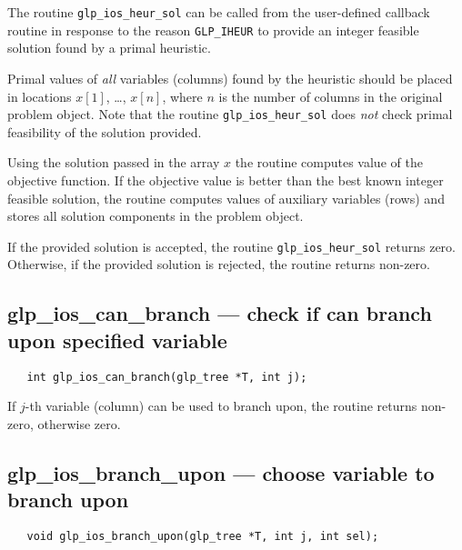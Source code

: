 The routine \verb|glp_ios_heur_sol| can be called from the user-defined
callback routine in response to the reason \verb|GLP_IHEUR| to provide
an integer feasible solution found by a primal heuristic.

Primal values of {\it all} variables (columns) found by the heuristic
should be placed in locations $x[1]$, \dots, $x[n]$, where $n$ is the
number of columns in the original problem object. Note that the routine
\verb|glp_ios_heur_sol| does {\it not} check primal feasibility of the
solution provided.

Using the solution passed in the array $x$ the routine computes value
of the objective function. If the objective value is better than the
best known integer feasible solution, the routine computes values of
auxiliary variables (rows) and stores all solution components in the
problem object.

\returns

If the provided solution is accepted, the routine
\verb|glp_ios_heur_sol| returns zero. Otherwise, if the provided
solution is rejected, the routine returns non-zero.

\vspace*{-5pt}

\subsection{glp\_ios\_can\_branch --- check if can branch upon
specified variable}

\synopsis

\begin{verbatim}
   int glp_ios_can_branch(glp_tree *T, int j);
\end{verbatim}

\returns

If $j$-th variable (column) can be used to branch upon, the routine
returns non-zero, otherwise zero.

\vspace*{-5pt}

\subsection{glp\_ios\_branch\_upon --- choose variable to branch upon}

\synopsis

\begin{verbatim}
   void glp_ios_branch_upon(glp_tree *T, int j, int sel);
\end{verbatim}

